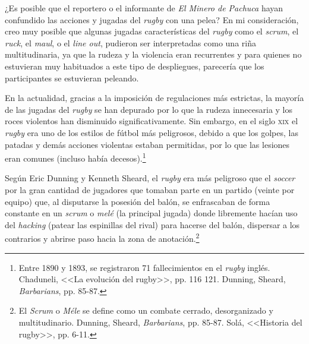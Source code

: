 \documentclass[11pt,a5paper,twoside]{book} %
\begin{document}
¿Es posible que el reportero o el informante de \emph{El Minero de Pachuca} hayan confundido las acciones y jugadas del \emph{rugby} con una pelea? En mi consideración, creo muy posible que algunas jugadas características del \emph{rugby} como el \emph{scrum}, el \emph{ruck}, el \emph{maul}, o el \emph{line out}, pudieron ser interpretadas como una riña multitudinaria, ya que la rudeza y la violencia eran recurrentes y para quienes no estuvieran muy habituados a este tipo de despliegues, parecería que los participantes se estuvieran peleando.

En la actualidad, gracias a la imposición de regulaciones más estrictas, la mayoría de las jugadas del \emph{rugby} se han depurado por lo que la rudeza innecesaria y los roces violentos han disminuido significativamente. Sin embargo, en el siglo \textsc{xix} el \emph{rugby} era uno de los estilos de fútbol más peligrosos, debido a que los golpes, las patadas y demás acciones violentas estaban permitidas, por lo que las lesiones eran comunes (incluso había decesos).\footnote{Entre 1890 y 1893, se registraron 71 fallecimientos en el \emph{rugby} inglés. Chaduneli, <<La evolución del rugby>>, pp. 116 121. Dunning, Sheard, \emph{Barbarians}, pp. 85-87.}

Según Eric Dunning y Kenneth Sheard, el \emph{rugby} era más peligroso que el \emph{soccer} por la gran cantidad de jugadores que tomaban parte en un partido (veinte por equipo) que, al disputarse la posesión del balón, se enfrascaban de forma constante en un \emph{scrum} o \emph{melé} (la principal jugada) donde libremente hacían uso del \emph{hacking} (patear las espinillas del rival) para hacerse del balón, dispersar a los contrarios y abrirse paso hacia la zona de anotación.\footnote{El \emph{Scrum} o \emph{Méle} se define como un combate cerrado, desorganizado y multitudinario. Dunning, Sheard, \emph{Barbarians}, pp. 85-87. Solá, <<Historia del rugby>>, pp. 6-11.}
\end{document}
